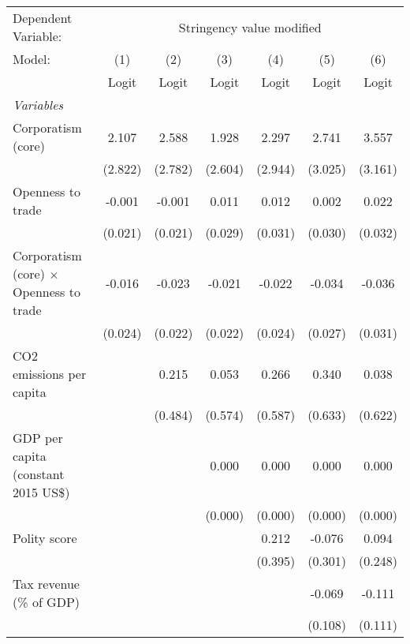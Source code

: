 
\begingroup
\centering
\begin{tabular}{lcccccc}
   \toprule
   Dependent Variable: & \multicolumn{6}{c}{Stringency value modified}\\
   Model:                                         & (1)     & (2)     & (3)     & (4)     & (5)     & (6)\\  
                                                  &  Logit  & Logit   & Logit   & Logit   & Logit   & Logit\\  
   \midrule
   \emph{Variables}\\
   Corporatism (core)                             & 2.107   & 2.588   & 1.928   & 2.297   & 2.741   & 3.557\\   
                                                  & (2.822) & (2.782) & (2.604) & (2.944) & (3.025) & (3.161)\\   
   Openness to trade                              & -0.001  & -0.001  & 0.011   & 0.012   & 0.002   & 0.022\\   
                                                  & (0.021) & (0.021) & (0.029) & (0.031) & (0.030) & (0.032)\\   
   Corporatism (core) $\times$ Openness to trade  & -0.016  & -0.023  & -0.021  & -0.022  & -0.034  & -0.036\\   
                                                  & (0.024) & (0.022) & (0.022) & (0.024) & (0.027) & (0.031)\\   
   CO2 emissions per capita                       &         & 0.215   & 0.053   & 0.266   & 0.340   & 0.038\\   
                                                  &         & (0.484) & (0.574) & (0.587) & (0.633) & (0.622)\\   
   GDP per capita (constant 2015 US\$)            &         &         & 0.000   & 0.000   & 0.000   & 0.000\\   
                                                  &         &         & (0.000) & (0.000) & (0.000) & (0.000)\\   
   Polity score                                   &         &         &         & 0.212   & -0.076  & 0.094\\   
                                                  &         &         &         & (0.395) & (0.301) & (0.248)\\   
   Tax revenue (\% of GDP)                        &         &         &         &         & -0.069  & -0.111\\   
                                                  &         &         &         &         & (0.108) & (0.111)\\   

\end{tabular}
